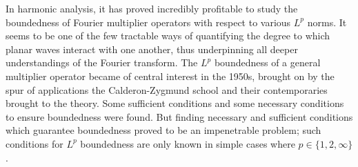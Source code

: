 \documentclass[11pt]{article}
\DeclareMathOperator{\RR}{\mathbb{R}}
\begin{document}
In harmonic analysis, it has proved incredibly profitable to study the boundedness of Fourier multiplier operators with respect to various $L^p$ norms. It seems to be one of the few tractable ways of quantifying the degree to which planar waves interact with one another, thus underpinning all deeper understandings of the Fourier transform. The $L^p$ boundedness of a general multiplier operator became of central interest in the 1950s, brought on by the spur of applications the Calderon-Zygmund school and their contemporaries brought to the theory. Some sufficient conditions and some necessary conditions to ensure boundedness were found. But finding necessary and sufficient conditions which guarantee boundedness proved to be an impenetrable problem; %
such conditions for $L^p$ boundedness are only known in simple cases where $p \in \{ 1, 2, \infty \}$.
%
%
%
%
%
%
%
%
%
% 
%
%
%
%
\end{document}
